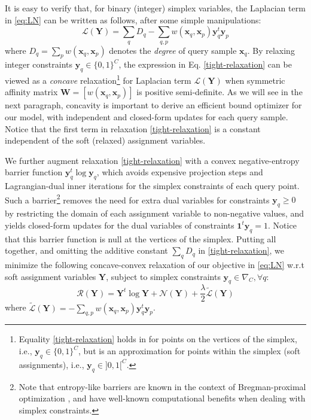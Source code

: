 \documentclass{article}
\newcommand{\yy}{{\mathbf y}}
\newcommand{\Ncal}{\mathcal{N}}
\newcommand{\Rcal}{\mathcal{R}}
\newcommand{\Lcal}{\mathcal{L}}
\newcommand{\xxq}{\mathbf{x}}
\newcommand{\YY}{\mathbf Y}
\newcommand{\WW}{\mathbf W}
\begin{document}
It is easy to verify that, for binary (integer) simplex variables, the Laplacian term in \eqref{eq:LN} can be written as follows, after some simple manipulations: 
\begin{equation}
\label{tight-relaxation}
\Lcal(\YY) = \sum_{q} D_{q} - \sum_{q,p} w (\xxq_q, \xxq_p) \yy_{q}^{t} \yy_p
\end{equation} 
where $D_q = \sum_pw(\mathbf{x}_q,\mathbf{x}_p)$ denotes the {\em degree} of query sample $\mathbf{x}_q$. 
By relaxing integer constraints $\yy_q \in\{0,1\}^C$, the expression in Eq. \eqref{tight-relaxation} can be viewed as a {\em concave} relaxation\footnote{Equality \eqref{tight-relaxation} holds in for points on the vertices of the simplex, i.e.,  
$\yy_q \in\{0,1\}^C$, but is an approximation for points within the simplex (soft assignments), i.e., $\yy_q \in ]0,1[^C$.} for Laplacian term $\Lcal(\YY)$ when symmetric affinity matrix $\WW = [w (\xxq_q, \xxq_p)]$ is positive semi-definite. 
As we will see in the next paragraph, concavity is important to derive an efficient bound optimizer for our model, with independent and closed-form updates for each query sample. Notice that the first term in relaxation \eqref{tight-relaxation} is a constant independent of the soft (relaxed) assignment variables.  

We further augment relaxation \eqref{tight-relaxation} with a convex negative-entropy barrier function $\yy_q^{t} \log \yy_q$, 
which avoids expensive projection steps and Lagrangian-dual inner iterations for the simplex constraints of each query point. 
Such a barrier\footnote{Note that entropy-like barriers are known in the context of Bregman-proximal optimization \cite{Yuan2017}, and have well-known computational benefits when dealing with simplex constraints.} removes the need for extra dual variables for constraints $\yy_q \geq 0$ by 
restricting the domain of each assignment variable to non-negative values, and yields closed-form updates for the dual variables of 
constraints $\mathbf{1}^t \yy_q = 1$. Notice that this barrier function is null at the vertices of the simplex. Putting all together, and omitting the additive constant $\sum_{q} D_{q}$ in \eqref{tight-relaxation}, we minimize the following concave-convex relaxation of our objective in \eqref{eq:LN} w.r.t soft assignment variables $\YY$, subject to simplex constraints $\yy_q \in \nabla_C, \forall q$:  
\begin{equation}
\label{tight-relaxation-2}
{\Rcal}(\YY) = \YY^{t} \log \YY + {\Ncal(\YY)} + \frac{\lambda}{2} {\tilde{\Lcal}(\YY)}
\end{equation}
where $\tilde{\Lcal}(\YY) = - \sum_{q,p} w (\xxq_q, \xxq_p) \yy_{q}^{t} \yy_p$.  
\end{document}
